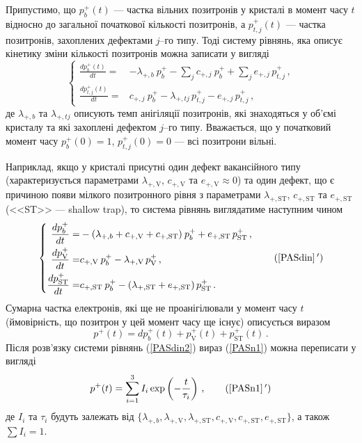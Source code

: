 \documentclass[10pt,a5paper,titlepage,oneside]{book}
\numberwithin{equation}{part}
\begin{document}
Припустимо, що
$p_{b}^+(t)$ --- частка вільних позитронів у кристалі в момент часу $t$ відносно до загальної початкової кількості позитронів, а
$p_{t,j}^+(t)$  --- частка позитронів, захоплених дефектами $j$--го типу.
Тоді систему рівнянь, яка описує кінетику зміни кількості позитронів можна записати у вигляді
\begin{equation}\label{PASdin}
\left\{
\begin{aligned}%
\frac{dp_{b}^+(t)}{dt}=& -\lambda_{+,b} \:p_{b}^+ - \sum_j c_{+,j} \:p_{b}^+ + \sum_j e_{+,j} \,p_{t,j}^+ \,,\\
\frac{dp_{t,j}^+(t)}{dt}=& c_{+,j} \:p_{b}^+ - \lambda_{+,tj}\,p_{t,j}^+ - e_{+,j} \,p_{t,j}^+ \,,
\end{aligned} \right.
\end{equation}
де
$\lambda_{+,b}$ та $\lambda_{+,tj}$ описують темп анігіляції позитронів, які знаходяться
у об'ємі кристалу та які захоплені дефектом $j$--го  типу.
Вважається, що у початковий момент часу $p_{b}^+(0)=1$, $p_{t,j}^+(0)=0$ --- всі позитрони вільні.

Наприклад, якщо у кристалі присутні один дефект вакансійного типу
(характеризується параметрами $\lambda_{+,\mathrm{V}}$, $c_{+,\mathrm{V}}$ та $e_{+,\mathrm{V}}\approx0$)
та один дефект, що є причиною появи мілкого позитронного рівня з параметрами
$\lambda_{+,\mathrm{ST}}$, $c_{+,\mathrm{ST}}$ та $e_{+,\mathrm{ST}}$ (<<ST>> --- shallow trap),
то система рівнянь виглядатиме наступним чином
\begin{equation}\label{PASdin2}
\left\{
\begin{aligned}%
\frac{dp_{b}^+}{dt}=& -(\lambda_{+,b}+c_{+,\mathrm{V}}+c_{+,\mathrm{ST}}) \:p_{b}^+ +e_{+,\mathrm{ST}}\,p_{\mathrm{ST}}^+ \,,\\
\frac{dp_{\mathrm{V}}^+}{dt}=& c_{+,\mathrm{V}} \:p_{b}^+ - \lambda_{+,\mathrm{V}}\,p_{\mathrm{V}}^+ \,,\\
\frac{dp_{\mathrm{ST}}^+}{dt}=& c_{+,\mathrm{ST}} \:p_{b}^+ - (\lambda_{+,\mathrm{ST}}+e_{+,\mathrm{ST}})\,p_{\mathrm{ST}}^+ \,.
\end{aligned} \right.\tag{\ref{PASdin}\,$'$}
\end{equation}
Сумарна частка електронів, які ще не проанігілювали у момент часу $t$
(ймовірність, що позитрон у цей момент часу ще існує) описується виразом
\begin{equation}\label{PASn1}
p^+(t)=dp_{b}^+(t) + p_{\mathrm{V}}^+(t) + p_{\mathrm{ST}}^+(t)\,.
\end{equation}
Після розв'язку системи рівнянь (\ref{PASdin2}) вираз (\ref{PASn1})  можна
переписати у вигляді
\begin{equation}\label{PASn2}
p^+(t)=\sum_{i=1}^3I_i\exp\left(-\frac{t}{\tau_i}\right)\,,\tag{\ref{PASn1}\,$'$}
\end{equation}
де
$I_i$ та $\tau_i$ будуть залежать від $\{\lambda_{+,b},\lambda_{+,\mathrm{V}},\lambda_{+,\mathrm{ST}},c_{+,\mathrm{V}},c_{+,\mathrm{ST}},e_{+,\mathrm{ST}}\}$,
а також $\sum I_i=1$.
\end{document}
